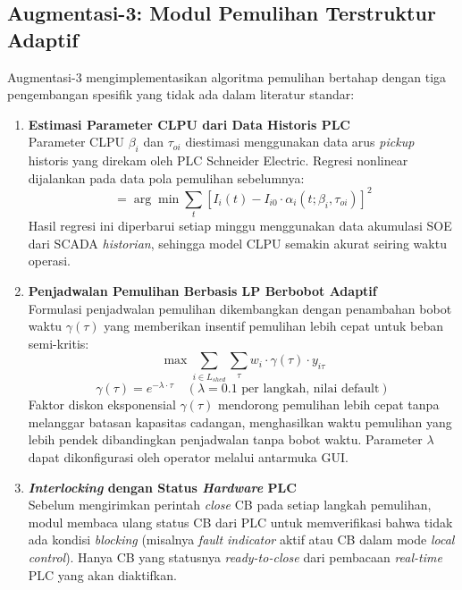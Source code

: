 \subsection{Augmentasi-3: Modul Pemulihan Terstruktur Adaptif}
\label{subsec:Augmentasi_3}

Augmentasi-3 mengimplementasikan algoritma pemulihan bertahap dengan tiga pengembangan spesifik yang tidak ada dalam literatur standar:

\begin{enumerate}
\item[a.] \textbf{Estimasi Parameter CLPU dari Data Historis PLC} \\
Parameter CLPU $\beta_{i}$ dan $\tau_{oi}$ diestimasi menggunakan data arus \textit{pickup} historis yang direkam oleh PLC Schneider Electric. Regresi nonlinear dijalankan pada data pola pemulihan sebelumnya:
\begin{equation}
    [\hat{\beta}_{i}, \hat{\tau}_{oi}] = \arg\min \sum_{t} \left[ I_{i}(t) - I_{i0} \cdot \alpha_{i}(t; \beta_{i}, \tau_{oi}) \right]^{2}
\end{equation}
Hasil regresi ini diperbarui setiap minggu menggunakan data akumulasi SOE dari SCADA \textit{historian}, sehingga model CLPU semakin akurat seiring waktu operasi.

\item[b.] \textbf{Penjadwalan Pemulihan Berbasis LP Berbobot Adaptif} \\
Formulasi penjadwalan pemulihan dikembangkan dengan penambahan bobot waktu $\gamma(\tau)$ yang memberikan insentif pemulihan lebih cepat untuk beban semi-kritis:
\begin{equation}
    \max \sum_{i\in L_{shed}} \sum_{\tau} w_{i} \cdot \gamma(\tau) \cdot y_{i\tau}
\end{equation}
\begin{equation}
    \gamma(\tau) = e^{-\lambda\cdot\tau} \quad (\lambda=0.1 \text{ per langkah, nilai default})
\end{equation}
Faktor diskon eksponensial $\gamma(\tau)$ mendorong pemulihan lebih cepat tanpa melanggar batasan kapasitas cadangan, menghasilkan waktu pemulihan yang lebih pendek dibandingkan penjadwalan tanpa bobot waktu. Parameter $\lambda$ dapat dikonfigurasi oleh operator melalui antarmuka GUI.

\item[c.] \textbf{\textit{Interlocking} dengan Status \textit{Hardware} PLC} \\
Sebelum mengirimkan perintah \textit{close} CB pada setiap langkah pemulihan, modul membaca ulang status CB dari PLC untuk memverifikasi bahwa tidak ada kondisi \textit{blocking} (misalnya \textit{fault indicator} aktif atau CB dalam mode \textit{local control}). Hanya CB yang statusnya \textit{ready-to-close} dari pembacaan \textit{real-time} PLC yang akan diaktifkan.
\end{enumerate}

